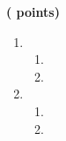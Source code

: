 \documentclass[12pt,french]{book}
\begin{document}
\begin{spacing}{1.2}
\begin{enumerate}[label=\arabic*.]
\end{enumerate}






\medskip\exercice \hfill \textbf{( points)}\par
\begin{enumerate}[label=\arabic*.]
\item 
	\begin{enumerate}[label=\alph*)]
		
	\item 

		
	\item
	
	\end{enumerate}

\item 
\begin{enumerate}[label=\alph*)]
	\item 
	
	\item 
	
		
	\end{enumerate}

\end{enumerate}





%



\end{spacing}
\end{document}
